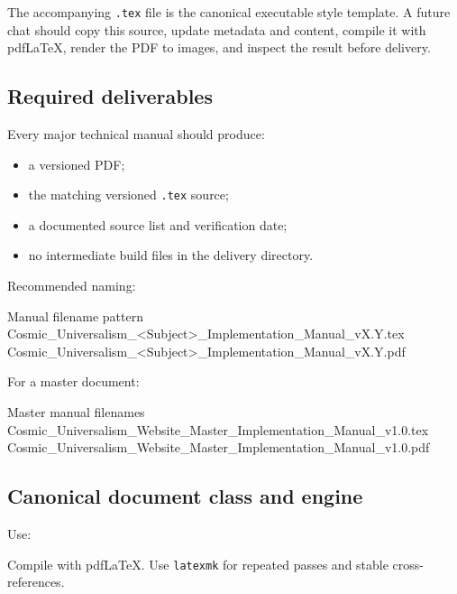 \documentclass[11pt,letterpaper]{article}
\begin{document}
\begin{authoringbox}
The accompanying \texttt{.tex} file is the canonical executable style
template. A future chat should copy this source, update metadata and content,
compile it with pdfLaTeX, render the PDF to images, and inspect the result
before delivery.
\end{authoringbox}

\subsection{Required deliverables}

Every major technical manual should produce:

\begin{itemize}
    \item a versioned PDF;
    \item the matching versioned \texttt{.tex} source;
    \item a documented source list and verification date;
    \item no intermediate build files in the delivery directory.
\end{itemize}

Recommended naming:

\begin{codebox}{Manual filename pattern}
Cosmic_Universalism_<Subject>_Implementation_Manual_vX.Y.tex
Cosmic_Universalism_<Subject>_Implementation_Manual_vX.Y.pdf
\end{codebox}

For a master document:

\begin{codebox}{Master manual filenames}
Cosmic_Universalism_Website_Master_Implementation_Manual_v1.0.tex
Cosmic_Universalism_Website_Master_Implementation_Manual_v1.0.pdf
\end{codebox}

\subsection{Canonical document class and engine}

Use:


Compile with pdfLaTeX. Use \texttt{latexmk} for repeated passes and stable
cross-references.
\end{document}
